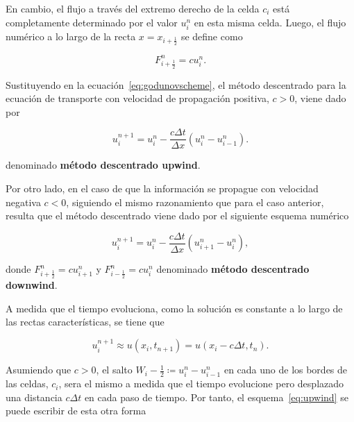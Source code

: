 En cambio, el flujo a través del extremo derecho de la celda $c_{i}$
está completamente determinado por el valor $u^{n}_{i}$ en esta misma celda.
Luego, el flujo numérico a lo largo de la recta $x=x_{i+\frac{1}{2}}$
se define como

\begin{equation*}
  F^{n}_{i+\frac{1}{2}}=
  cu^{n}_{i}.
\end{equation*}

Sustituyendo en la ecuación~\eqref{eq:godunovscheme}, el método
descentrado para la ecuación de transporte con velocidad de
propagación positiva, $c>0$, viene dado por

\begin{equation}\label{eq:upwind}
  u^{n+1}_{i}=
  u^{n}_{i}-
  \frac{c\Delta t}{\Delta x}
  \left(
  u^{n}_{i}-
  u^{n}_{i-1}
  \right).
\end{equation}

denominado \textbf{método descentrado upwind}.

Por otro lado, en el caso de que la información se propague con
velocidad negativa $c<0$, %
siguiendo el mismo razonamiento que para el caso anterior, resulta
que el método descentrado viene dado por el siguiente esquema
numérico

\begin{equation}\label{eq:downwind}
  u^{n+1}_{i}=
  u^{n}_{i}-
  \frac{c\Delta t}{\Delta x}
  \left(
  u^{n}_{i+1}-
  u^{n}_{i}
  \right),
\end{equation}

donde
\begin{math}
  F^{n}_{i+\frac{1}{2}}=
  cu^{n}_{i+1}
\end{math}
y
\begin{math}
  F^{n}_{i-\frac{1}{2}}=
  cu^{n}_{i}
\end{math}
denominado \textbf{método descentrado downwind}.

A medida que el tiempo evoluciona, como la solución es constante a lo
largo de las rectas características, se tiene que

\begin{equation*}
  u^{n+1}_{i}\approx
  u
  \left(x_{i},t_{n+1}\right)=
  u
  \left(
  x_{i}-
  c\Delta t,t_{n}
  \right).
\end{equation*}

Asumiendo que $c>0$, el salto
\begin{math}
  W_{i}-\frac{1}{2}\coloneqq
  u^{n}_{i}-
  u_{i-1}^{n}
\end{math}
en cada uno de los bordes de las celdas, $c_{i}$, sera el mismo a
medida que el tiempo evolucione pero desplazado una distancia
$c\Delta t$ en cada paso de tiempo.
Por tanto, el esquema~\eqref{eq:upwind} se puede escribir de esta
otra forma

